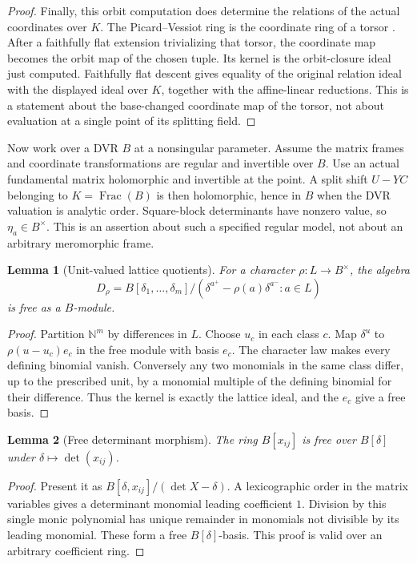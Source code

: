 \documentclass[11pt]{article}
\numberwithin{equation}{section}
\newtheorem{lemma}[lemma]{Lemma}
\theoremstyle{definition}
\theoremstyle{remark}
\newcommand{\N}{\mathbb N}
\begin{document}
\begin{proof}
Finally, this orbit computation does determine the relations of the
actual coordinates over $K$. The Picard--Vessiot ring is the coordinate
ring of a torsor \cite[Proposition~1.3.20]{Singer}. After a faithfully
flat extension trivializing that torsor, the coordinate map becomes
the orbit map of the chosen tuple. Its kernel is the orbit-closure
ideal just computed. Faithfully flat descent gives equality of the
original relation ideal with the displayed ideal over $K$, together
with the affine-linear reductions. This is a statement about the
base-changed coordinate map of the torsor, not about evaluation at a
single point of its splitting field.
\end{proof}

Now work over a DVR $B$ at a nonsingular parameter. Assume the matrix
frames and coordinate transformations are regular and invertible over $B$.
Use an actual fundamental matrix holomorphic and invertible at the point.
A split shift $U-YC$ belonging to $K=\operatorname{Frac}(B)$ is then
holomorphic, hence in $B$ when the DVR valuation is analytic order.
Square-block determinants have nonzero value, so $\eta_a\in B^\times$.
This is an assertion about such a specified regular model, not about an
arbitrary meromorphic frame.

\begin{lemma}[Unit-valued lattice quotients]\label{lem:flat-lattice}
For a character $\rho:L\to B^\times$, the algebra
\[
 D_\rho=B[\delta_1,\ldots,\delta_m]/
 (\delta^{a^+}-\rho(a)\delta^{a^-}:a\in L)
\]
is free as a $B$-module.
\end{lemma}
\begin{proof}
Partition $\N^m$ by differences in $L$. Choose $u_c$ in each class $c$.
Map $\delta^u$ to $\rho(u-u_c)e_c$ in the free module with basis $e_c$.
The character law makes every defining binomial vanish. Conversely any
two monomials in the same class differ, up to the prescribed unit, by a
monomial multiple of the defining binomial for their difference. Thus the
kernel is exactly the lattice ideal, and the $e_c$ give a free basis.
\end{proof}

\begin{lemma}[Free determinant morphism]\label{lem:free-determinant}
The ring $B[x_{ij}]$ is free over $B[\delta]$ under
$\delta\mapsto\det(x_{ij})$.
\end{lemma}
\begin{proof}
Present it as $B[\delta,x_{ij}]/(\det X-\delta)$. A lexicographic order in
the matrix variables gives a determinant monomial leading coefficient
$1$. Division by this single monic polynomial has unique remainder in
monomials not divisible by its leading monomial. These form a free
$B[\delta]$-basis. This proof is valid over an arbitrary coefficient ring.
\end{proof}
\end{document}
